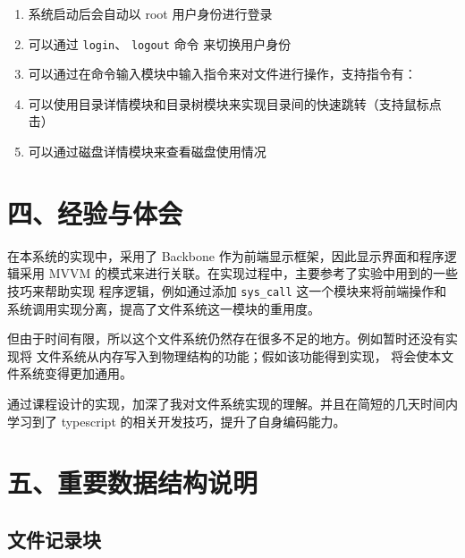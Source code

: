 \documentclass[12bp]{guo}
\begin{document}
\begin{enumerate}
    \item 系统启动后会自动以 root 用户身份进行登录
    \item 可以通过 \texttt{login}、 \texttt{logout} 命令
          来切换用户身份
    \item 可以通过在命令输入模块中输入指令来对文件进行操作，支持指令有：
    \item 可以使用目录详情模块和目录树模块来实现目录间的快速跳转（支持鼠标点击）
    \item 可以通过磁盘详情模块来查看磁盘使用情况
\end{enumerate}

\section{四、经验与体会}

在本系统的实现中，采用了 Backbone 作为前端显示框架，因此显示界面和程序逻辑采用
MVVM 的模式来进行关联。在实现过程中，主要参考了实验中用到的一些技巧来帮助实现
程序逻辑，例如通过添加 \texttt{sys_call} 这一个模块来将前端操作和
系统调用实现分离，提高了文件系统这一模块的重用度。


但由于时间有限，所以这个文件系统仍然存在很多不足的地方。例如暂时还没有实现将
文件系统从内存写入到物理结构的功能；假如该功能得到实现，
将会使本文件系统变得更加通用。


通过课程设计的实现，加深了我对文件系统实现的理解。并且在简短的几天时间内学习到了
typescript 的相关开发技巧，提升了自身编码能力。

\section{五、重要数据结构说明}

\subsection{文件记录块}
\end{document}
